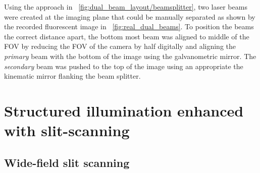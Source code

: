 Using the approach in \figurename~\ref{fig:dual_beam_layout/beamsplitter}, two laser beams were created at the imaging plane that could be manually separated as shown by the recorded fluorescent image in \figurename~\ref{fig:real_dual_beams}.
To position the beams the correct distance apart, the bottom most beam was aligned to middle of the \gls{FOV} by reducing the \gls{FOV} of the camera by half digitally and aligning the \emph{primary} beam with the bottom of the image using the galvanometric mirror.
The \emph{secondary} beam was pushed to the top of the image using an appropriate the kinematic mirror flanking the beam splitter.
%  
%  
\section{Structured illumination enhanced with slit-scan\-ning}

\subsection{Wide-field slit scanning}

